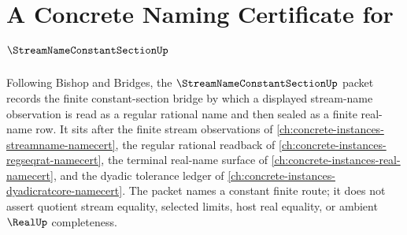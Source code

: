 \chapter{A Concrete Naming Certificate for $\StreamNameConstantSectionUp$}
\label{ch:concrete-instances-streamname-constant-section-namecert}

Following Bishop and Bridges, the $\StreamNameConstantSectionUp$ packet records the finite constant-section bridge by which a displayed stream-name observation is read as a regular rational name and then sealed as a finite real-name row. It sits after the finite stream observations of \autoref{ch:concrete-instances-streamname-namecert}, the regular rational readback of \autoref{ch:concrete-instances-regseqrat-namecert}, the terminal real-name surface of \autoref{ch:concrete-instances-real-namecert}, and the dyadic tolerance ledger of \autoref{ch:concrete-instances-dyadicratcore-namecert}. The packet names a constant finite route; it does not assert quotient stream equality, selected limits, host real equality, or ambient $\RealUp$ completeness.


